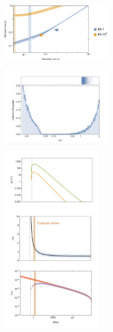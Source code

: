 \documentclass{pnastwo}
\begin{document}
\begin{figure}
\centering
\includegraphics[width=0.5\textwidth]{fig_DataHopf.pdf}
\caption{ %
}
\label{fig:hopf}
\end{figure}

\begin{figure}
\centering
\includegraphics[width=0.5\textwidth]{fig_ExtinctionAllometric.pdf}
\caption{ %
}
\label{fig:ext}
\end{figure} 
 
\begin{figure}
\centering
\includegraphics[width=0.45\textwidth]{fig_FPAllometric.pdf}
\caption{ %
}
\label{fig:mass}
\end{figure}  
 
\end{document}

